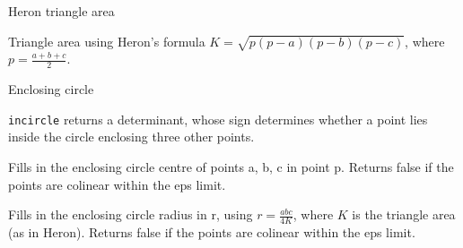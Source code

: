 \begin{algorithm}{Heron triangle area}

Triangle area using Heron's formula
$K=\sqrt{p(p-a)(p-b)(p-c)}$, where $p=\frac{a+b+c}{2}$.
\end{algorithm}

\begin{algorithm}{Enclosing circle}

{\tt incircle} returns a determinant, whose sign determines whether a point
lies inside the circle enclosing three other points.


Fills in the enclosing circle centre of points a, b, c in point p.
Returns false if the points are colinear within the eps limit.

Fills in the enclosing circle radius in r, using $r=\frac{abc}{4K}$,
where $K$ is the triangle area (as in Heron).
Returns false if the points are colinear within the eps limit.
\end{algorithm}
